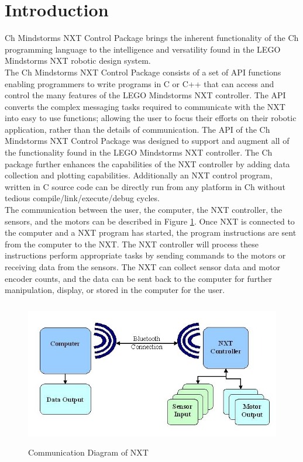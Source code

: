 \documentclass[11pt]{article}
\begin{document}
\section{Introduction}
Ch Mindstorms NXT Control Package brings the inherent functionality of the Ch programming language
to the intelligence and versatility found in the LEGO Mindstorms NXT robotic design system.\\
\newline
The Ch Mindstorms NXT Control Package consists of a set of API functions enabling programmers to 
write programs in C or C++ that can access and control the many features of the LEGO Mindstorms 
NXT controller. The API converts the complex messaging tasks required to communicate with the NXT 
into easy to use functions; allowing the user  to focus their efforts on their robotic application, 
rather than the details of communication. The API of the Ch Mindstorms NXT Control Package was 
designed to support and augment all of the functionality found in the LEGO Mindstorms NXT controller.
The Ch package further enhances the capabilities of the NXT controller by adding data collection and 
plotting capabilities. Additionally an NXT control program, written in C source code can be directly 
run from any platform in Ch without tedious compile/link/execute/debug cycles.\\
\newline
The communication between the user, the computer, the NXT controller, the sensors, and the motors can
be described in Figure \ref{fig_NXT_comm}. Once NXT is connected to the computer and a NXT program 
has started, the program instructions are sent from the computer to the NXT. The NXT controller will 
process these instructions perform appropriate tasks by sending commands to the motors or receiving 
data from the sensors. The NXT can collect sensor data and motor encoder counts, and the data can be 
sent back to the computer for further manipulation, display, or stored in the computer for the user.\\
\newline
\begin{figure}[h]
  \begin{center}
    \includegraphics[height=2.5in]{figure/mindstorm/NXT_connect.png}
    \caption{Communication Diagram of NXT\label{fig_NXT_comm}}
  \end{center}
\end{figure}
\end{document}

